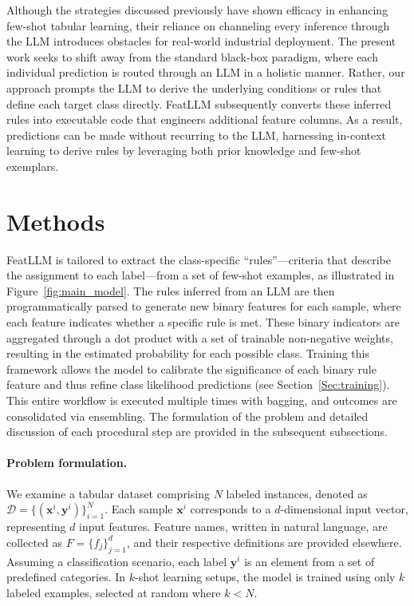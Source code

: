 Although the strategies discussed previously have shown efficacy in enhancing few-shot tabular learning, their reliance on channeling every inference through the LLM introduces obstacles for real-world industrial deployment. The present work seeks to shift away from the standard black-box paradigm, where each individual prediction is routed through an LLM in a holistic manner. Rather, our approach prompts the LLM to derive the underlying conditions or rules that define each target class directly. \textsf{FeatLLM} subsequently converts these inferred rules into executable code that engineers additional feature columns. As a result, predictions can be made without recurring to the LLM, harnessing in-context learning to derive rules by leveraging both prior knowledge and few-shot exemplars.

\section{Methods}
\textsf{FeatLLM} is tailored to extract the class-specific “rules”—criteria that describe the assignment to each label—from a set of few-shot examples, as illustrated in Figure~\ref{fig:main_model}. The rules inferred from an LLM are then programmatically parsed to generate new binary features for each sample, where each feature indicates whether a specific rule is met. These binary indicators are aggregated through a dot product with a set of trainable non-negative weights, resulting in the estimated probability for each possible class. Training this framework allows the model to calibrate the significance of each binary rule feature and thus refine class likelihood predictions (see Section~\ref{Sec:training}). This entire workflow is executed multiple times with bagging, and outcomes are consolidated via ensembling. The formulation of the problem and detailed discussion of each procedural step are provided in the subsequent subsections.

\vspace*{-0.12in}
\paragraph{Problem formulation.} We examine a tabular dataset comprising $N$ labeled instances, denoted as $\mathcal{D} = \{(\mathbf{x}^i, \mathbf{y}^i)\}_{i=1}^{N}$. Each sample $\mathbf{x}^i$ corresponds to a $d$-dimensional input vector, representing $d$ input features. Feature names, written in natural language, are collected as $F = \{f_j\}_{j=1}^{d}$, and their respective definitions are provided elsewhere. Assuming a classification scenario, each label $\mathbf{y}^i$ is an element from a set of predefined categories. In $k$-shot learning setups, the model is trained using only $k$ labeled examples, selected at random where $k < N$.

